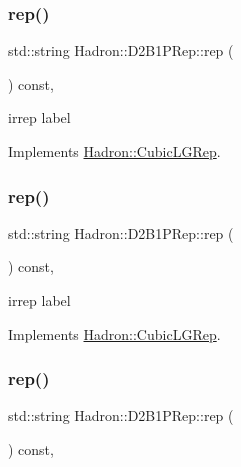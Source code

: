 \subsubsection{\texorpdfstring{rep()}{rep()}\hspace{0.1cm}{\footnotesize\ttfamily [1/3]}}
{\footnotesize\ttfamily std\+::string Hadron\+::\+D2\+B1\+P\+Rep\+::rep (\begin{DoxyParamCaption}{ }\end{DoxyParamCaption}) const\hspace{0.3cm}{\ttfamily [inline]}, {\ttfamily [virtual]}}

irrep label 

Implements \mbox{\hyperlink{structHadron_1_1CubicLGRep_a50f5ddbb8f4be4cee0106fa9e8c75e6c}{Hadron\+::\+Cubic\+L\+G\+Rep}}.

\mbox{\label{structHadron_1_1D2B1PRep_ab8cddfe5f5e849b0b3d804576558b445}} 
\subsubsection{\texorpdfstring{rep()}{rep()}\hspace{0.1cm}{\footnotesize\ttfamily [2/3]}}
{\footnotesize\ttfamily std\+::string Hadron\+::\+D2\+B1\+P\+Rep\+::rep (\begin{DoxyParamCaption}{ }\end{DoxyParamCaption}) const\hspace{0.3cm}{\ttfamily [inline]}, {\ttfamily [virtual]}}

irrep label 

Implements \mbox{\hyperlink{structHadron_1_1CubicLGRep_a50f5ddbb8f4be4cee0106fa9e8c75e6c}{Hadron\+::\+Cubic\+L\+G\+Rep}}.

\mbox{\label{structHadron_1_1D2B1PRep_ab8cddfe5f5e849b0b3d804576558b445}} 
\subsubsection{\texorpdfstring{rep()}{rep()}\hspace{0.1cm}{\footnotesize\ttfamily [3/3]}}
{\footnotesize\ttfamily std\+::string Hadron\+::\+D2\+B1\+P\+Rep\+::rep (\begin{DoxyParamCaption}{ }\end{DoxyParamCaption}) const\hspace{0.3cm}{\ttfamily [inline]}, {\ttfamily [virtual]}}

